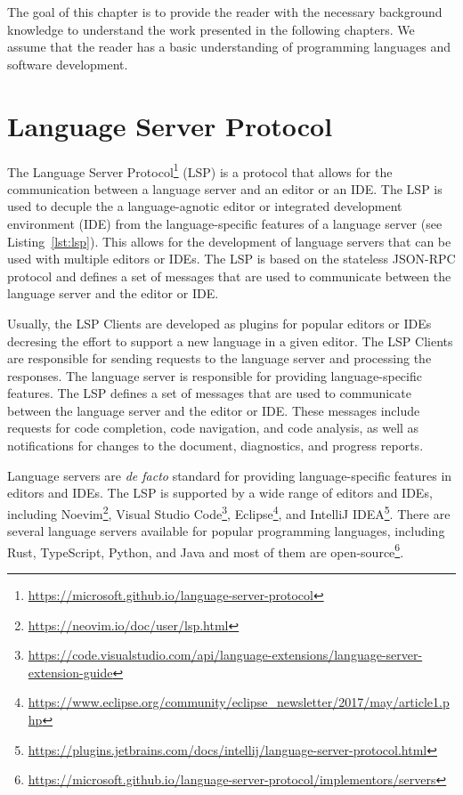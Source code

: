 The goal of this chapter is to provide the reader with the necessary background knowledge to understand the work presented in the following chapters. We assume that the reader has a basic understanding of programming languages and software development.

\section{Language Server Protocol}\label{sec:LanguageServerProtocol}
The Language Server Protocol\footnote{\url{https://microsoft.github.io/language-server-protocol}} (LSP) is a protocol that allows for the communication between a language server and an editor or an IDE. The LSP is used to decuple the a language-agnotic editor or integrated development environment (IDE) from the language-specific features of a language server (see Listing~\ref{lst:lsp}). This allows for the development of language servers that can be used with multiple editors or IDEs. The LSP is based on the stateless JSON-RPC protocol and defines a set of messages that are used to communicate between the language server and the editor or IDE.

Usually, the LSP Clients are developed as plugins for popular editors or IDEs decresing the effort to support a new language in a given editor. The LSP Clients are responsible for sending requests to the language server and processing the responses. The language server is responsible for providing language-specific features. The LSP defines a set of messages that are used to communicate between the language server and the editor or IDE. These messages include requests for code completion, code navigation, and code analysis, as well as notifications for changes to the document, diagnostics, and progress reports.

Language servers are \textit{de facto} standard for providing language-specific features in editors and IDEs. The LSP is supported by a wide range of editors and IDEs, including Noevim\footnote{\url{https://neovim.io/doc/user/lsp.html}}, Visual Studio Code\footnote{\url{https://code.visualstudio.com/api/language-extensions/language-server-extension-guide}}, Eclipse\footnote{\url{https://www.eclipse.org/community/eclipse_newsletter/2017/may/article1.php}}, and IntelliJ IDEA\footnote{\url{https://plugins.jetbrains.com/docs/intellij/language-server-protocol.html}}. There are several language servers available for popular programming languages, including Rust, TypeScript, Python, and Java and most of them are open-source\footnote{\url{https://microsoft.github.io/language-server-protocol/implementors/servers}}.

